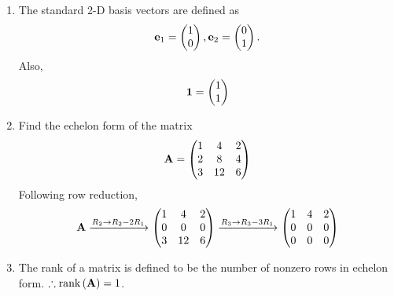 \begin{enumerate}[label=\thesubsection.\arabic*, ref=\thesubsection.\theenumi]
\begin{align}
			x(t-t_0) \system{F} c_ne^{-\j 2\pi n t_0},
\label{eq:EE26BTECH11202-Fourier-shift-time}
		\end{align}
		\solution 
\begin{align}
 \int_{-\frac{1}{2f_0}}^{\frac{1}{2f_0}} x_0\brak{t-t_0} e^{-\j 2\pi n f_0 t} \, dt 
 &=
 \int_{-\frac{1}{2f_0}}^{\frac{1}{2f_0}} x_0\brak{t} e^{-\j 2\pi n f_0 \brak{t+t_0}} \, dt 
 \\
 &=
e^{\j 2\pi n f_0 t_0} \int_{-\frac{1}{2f_0}}^{\frac{1}{2f_0}} x_0\brak{t} e^{-\j 2\pi n f_0 t} \, dt 
\label{eq:EE26BTECH11202-Fourier-shift-time-1}
\end{align}
after a change of variables.  Note that the limits of integration are unchanged due the periodicity of $x(t)$.
Transferring the exponential term in \eqref{eq:EE26BTECH11202-Fourier-shift-time-1} to the L.H.S yields
\eqref{eq:EE26BTECH11202-Fourier-shift-time}.
	\item The standard 2-D basis vectors are defined as
		\begin{align}
			\mathbf{e}_1 = \begin{pmatrix}1 \\ 0\end{pmatrix},
			\mathbf{e}_2 = \begin{pmatrix}0 \\ 1\end{pmatrix}.
			\label{eq:EE26BTECH11202-2D-basis}
		\end{align}
		Also, 
		\begin{align}
			\mathbf{1} = \begin{pmatrix}1 \\ 1\end{pmatrix}
			\label{eq:EE26BTECH11202-2D-one}
		\end{align}
\item Find the echelon form of the matrix
	\begin{align}
\mathbf{A} =  \begin{pmatrix}
1 & 4 & 2 \\
2 & 8 & 4 \\
3 & 12 & 6
\end{pmatrix}
\end{align}
\solution
Following row reduction, 
\begin{align}
\mathbf{A} \xrightarrow{R_2 \to R_2 - 2R_1} \begin{pmatrix}
1 & 4 & 2 \\
0 & 0 & 0 \\
3 & 12 & 6
\end{pmatrix}
\xrightarrow{R_3 \to R_3 - 3R_1} \begin{pmatrix}
1 & 4 & 2 \\
0 & 0 & 0 \\
0 & 0 & 0
\end{pmatrix}
	\label{eq:EE26BTECH11202-echelon-def}
\end{align}
\item The rank of a matrix is defined to be the number of nonzero rows in echelon form.
$\therefore \text{rank}\left(\mathbf{A}\right) = 1$.

\end{enumerate}
